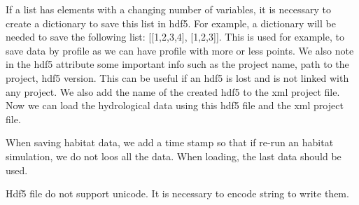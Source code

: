 \documentclass[letterpaper,10pt,english]{sphinxmanual}
\begin{document}
\begin{fulllineitems}
\begin{itemize}
\begin{itemize}
\end{itemize}

\end{itemize}

If a list has elements with a changing number of variables, it is necessary to create a dictionary to save
this list in hdf5. For example, a dictionary will be needed to save the following list: {[}{[}1,2,3,4{]}, {[}1,2,3{]}{]}.
This is used for example, to save data by profile as we can have profile with more or less points. We also note
in the hdf5 attribute some important info such as the project name, path to the project, hdf5 version.
This can be useful if an hdf5 is lost and is not linked with any project. We also add the name of the created
hdf5 to the xml project file. Now we can load the hydrological data using this hdf5 file and the xml project file.

When saving habitat data, we add a time stamp so that if re-run an habitat simulation, we do not loos all the data.
When loading, the last data should be used.

Hdf5 file do not support unicode. It is necessary to encode string to write them.

\end{fulllineitems}

\end{document}
